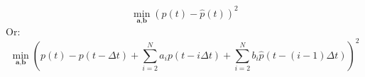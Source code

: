 \begin{equation}
	\min_{\textbf{a}, \textbf{b}} \left(p(t) - \hat{p}(t)\right)^2
\label{ch2:equ:least-squares-1}
\end{equation}
Or:
\begin{equation}
	\min_{\textbf{a}, \textbf{b}} \left(p(t) - p(t - \Delta t) + \sum_{i=2}^{N} a_i p(t-i\Delta t) + \sum_{i=2}^{N} b_i \hat{p}(t-(i-1)\Delta t)\right)^2
\label{ch2:equ:least-squares-2}
\end{equation}
